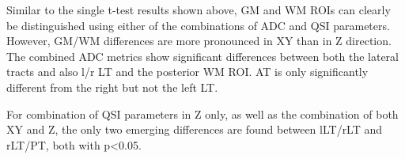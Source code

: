 Similar to the single t-test results shown above, GM and WM \glspl{ROI} can clearly be distinguished using either of the combinations of \gls{ADC} and \gls{QSI} parameters. However, GM/WM differences are more pronounced in XY than in Z direction. The combined ADC metrics show significant differences between both the lateral tracts and also l/r LT and the posterior WM \gls{ROI}. AT is only significantly different from the right but not the left LT.

For combination of \gls{QSI} parameters in Z only, as well as the combination of both XY and Z, the only two emerging differences are found between lLT/rLT and rLT/PT, both with p<0.05.%

\begin{table}[H]
\begin{captionframe}
  \caption[Significance of pair-wise differences between SC tracts in diffusivities and QSI parameters.]{Significance of pair-wise differences between SC tracts in diffusivities and QSI parameters (confidence interval: 95\%). Statistically significant differences are marked as follows: \textbf{bold} if p<0.05, \textbf{\emph{bold-italic}} if p<0.01.}	
  \label{tab:chap5exp1 single ttest}%
\end{captionframe}
\begin{tableframe}
\centering
	\footnotesize
\end{tableframe}
\end{table}
